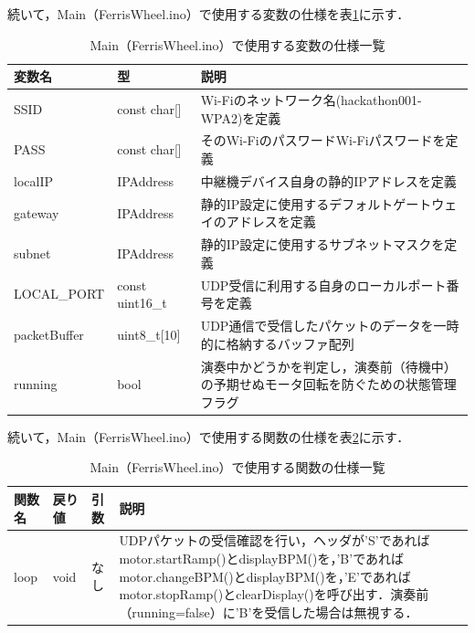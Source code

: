 \fi

\iffalse
続いて，Main（FerrisWheel.ino）で使用する変数の仕様を表\ref{table:kan_main_var}に示す．

\begin{table}[H]
    \caption{Main（FerrisWheel.ino）で使用する変数の仕様一覧}
    \centering
    \label{table:kan_main_var}
    \begin{tabular}{p{3.9cm}p{3.4cm}p{6.2cm}}
    \hline
    \textbf{変数名} & \textbf{型} & \textbf{説明}\\
    \hline
    SSID & const char[] & Wi-Fiのネットワーク名(hackathon001-WPA2)を定義\\
    \hline
    PASS & const char[] & そのWi-FiのパスワードWi-Fiパスワードを定義\\
    \hline
    localIP & IPAddress & 中継機デバイス自身の静的IPアドレスを定義\\
    \hline
    gateway & IPAddress & 静的IP設定に使用するデフォルトゲートウェイのアドレスを定義\\
    \hline
    subnet & IPAddress & 静的IP設定に使用するサブネットマスクを定義\\
    \hline
    LOCAL\_PORT & const uint16\_t & UDP受信に利用する自身のローカルポート番号を定義\\
    \hline
    packetBuffer & uint8\_t[10] & UDP通信で受信したパケットのデータを一時的に格納するバッファ配列\\
    \hline
    running & bool & 演奏中かどうかを判定し，演奏前（待機中）の予期せぬモータ回転を防ぐための状態管理フラグ\\
    \hline
    \end{tabular}
\end{table}

続いて，Main（FerrisWheel.ino）で使用する関数の仕様を表\ref{table:kan_main_func}に示す．

\begin{table}[H]
    \caption{Main（FerrisWheel.ino）で使用する関数の仕様一覧}
    \centering
    \label{table:kan_main_func}
    \begin{tabular}{p{2.4cm}p{1.6cm}p{2.2cm}p{7.3cm}}
    \hline
    \textbf{関数名} & \textbf{戻り値} & \textbf{引数} & \textbf{説明}\\
    \hline
    loop & void & なし & UDPパケットの受信確認を行い，ヘッダが'S'であればmotor.startRamp()とdisplayBPM()を，'B'であればmotor.changeBPM()とdisplayBPM()を，'E'であればmotor.stopRamp()とclearDisplay()を呼び出す．演奏前（running=false）に'B'を受信した場合は無視する．\\
    \hline
    \end{tabular}
\end{table}

